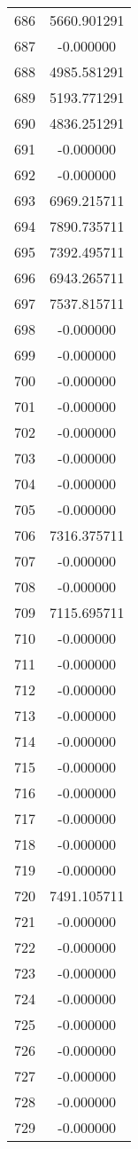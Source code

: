 \documentclass[12pt]{article}
\begin{document}
\begin{longtable}{@{}cc@{}}
686 & 5660.901291 \\
687 & -0.000000 \\
688 & 4985.581291 \\
689 & 5193.771291 \\
690 & 4836.251291 \\
691 & -0.000000 \\
692 & -0.000000 \\
693 & 6969.215711 \\
694 & 7890.735711 \\
695 & 7392.495711 \\
696 & 6943.265711 \\
697 & 7537.815711 \\
698 & -0.000000 \\
699 & -0.000000 \\
700 & -0.000000 \\
701 & -0.000000 \\
702 & -0.000000 \\
703 & -0.000000 \\
704 & -0.000000 \\
705 & -0.000000 \\
706 & 7316.375711 \\
707 & -0.000000 \\
708 & -0.000000 \\
709 & 7115.695711 \\
710 & -0.000000 \\
711 & -0.000000 \\
712 & -0.000000 \\
713 & -0.000000 \\
714 & -0.000000 \\
715 & -0.000000 \\
716 & -0.000000 \\
717 & -0.000000 \\
718 & -0.000000 \\
719 & -0.000000 \\
720 & 7491.105711 \\
721 & -0.000000 \\
722 & -0.000000 \\
723 & -0.000000 \\
724 & -0.000000 \\
725 & -0.000000 \\
726 & -0.000000 \\
727 & -0.000000 \\
728 & -0.000000 \\
729 & -0.000000 \\

\end{longtable}
\end{document}
